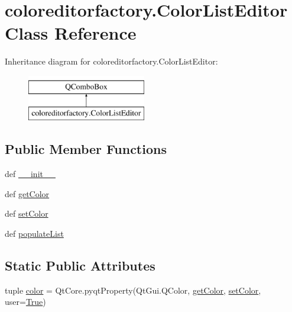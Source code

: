 \hypertarget{classcoloreditorfactory_1_1ColorListEditor}{}\section{coloreditorfactory.\+Color\+List\+Editor Class Reference}
\label{classcoloreditorfactory_1_1ColorListEditor}
Inheritance diagram for coloreditorfactory.\+Color\+List\+Editor\+:\begin{figure}[H]
\begin{center}
\leavevmode
\includegraphics[height=2.000000cm]{classcoloreditorfactory_1_1ColorListEditor}
\end{center}
\end{figure}
\subsection*{Public Member Functions}
\begin{DoxyCompactItemize}
\item 
def \hyperlink{classcoloreditorfactory_1_1ColorListEditor_a09fb598c7d736538bcdaa383e81b3909}{\+\_\+\+\_\+init\+\_\+\+\_\+}
\item 
def \hyperlink{classcoloreditorfactory_1_1ColorListEditor_ac1e95eb876600c7380aaa1732ef7def5}{get\+Color}
\item 
def \hyperlink{classcoloreditorfactory_1_1ColorListEditor_a6ce7e6a2e6eacd0a93b46617e4953c42}{set\+Color}
\item 
def \hyperlink{classcoloreditorfactory_1_1ColorListEditor_a4df53d620216ad8ebd3413e42b54f630}{populate\+List}
\end{DoxyCompactItemize}
\subsection*{Static Public Attributes}
\begin{DoxyCompactItemize}
\item 
tuple \hyperlink{classcoloreditorfactory_1_1ColorListEditor_a2a4822edece56e367655fa30a4eeaf7c}{color} = Qt\+Core.\+pyqt\+Property(Qt\+Gui.\+Q\+Color, \hyperlink{classcoloreditorfactory_1_1ColorListEditor_ac1e95eb876600c7380aaa1732ef7def5}{get\+Color}, \hyperlink{classcoloreditorfactory_1_1ColorListEditor_a6ce7e6a2e6eacd0a93b46617e4953c42}{set\+Color}, user=\hyperlink{libqhull_8h_add3ca9eefe3b5b754426f51d3043e579}{True})
\end{DoxyCompactItemize}



